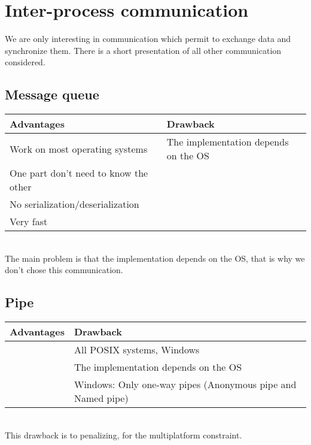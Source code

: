 
\chapter{Inter-process communication}
\label{annex:choice}


We are only interesting in communication which permit to exchange data and synchronize them. There is a short presentation of all other communication considered.

\section{Message queue}

\begin{tabular}{|p{}||p{}|}
\hline
  \textbf{Advantages} & \textbf{Drawback}\\
  \hline
  Work on most operating systems & The implementation depends on the OS\\
  \hline
  One part don't need to know the other &\\
  \hline
  No serialization/deserialization & \\
  \hline
  Very fast&\\
  \hline
\end{tabular}
~\\

The main problem is that the implementation depends on the OS, that is why we don't chose this communication.



\section{Pipe}

\begin{tabular}{|p{}||p{}|}
  \hline
  \textbf{Advantages}&\textbf{Drawback}\\
  \hline
                     &All POSIX systems, Windows\\
  \hline
                     &The implementation depends on the OS\\
  \hline
                     & Windows: Only one-way pipes (Anonymous pipe and Named pipe\cite{windows})\\
  \hline
\end{tabular}
~\\

This drawback is to penalizing, for the multiplatform constraint.

